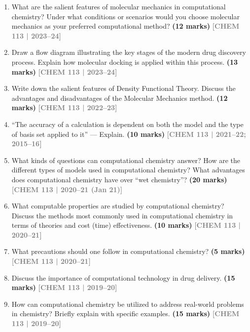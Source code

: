 \documentclass[12pt,a3paper]{article}
\newcommand{\yr}[1]{\hfill\textcolor{gray}{\small\textbf{[#1]}}}
\newcommand{\mk}[1]{\textcolor{orange!70!black}{\small\textbf{(#1 marks)}}}
\begin{document}
\begin{enumerate}
\item What are the salient features of molecular mechanics in computational chemistry? Under what conditions or scenarios would you choose molecular mechanics as your preferred computational method? \mk{12}
\yr{CHEM 113 | 2023--24}



\item Draw a flow diagram illustrating the key stages of the modern drug discovery process. Explain how molecular docking is applied within this process. \mk{13}
\yr{CHEM 113 | 2023--24}




\item Write down the salient features of Density Functional Theory. Discuss the advantages and disadvantages of the Molecular Mechanics method. \mk{12}
\yr{CHEM 113 | 2022--23}



\item ``The accuracy of a calculation is dependent on both the model and the type of basis set applied to it'' --- Explain. \mk{10}
\yr{CHEM 113 | 2021--22; 2015--16}



\item What kinds of questions can computational chemistry answer? How are the different types of models used in computational chemistry? What advantages does computational chemistry have over ``wet chemistry''? \mk{20}
\yr{CHEM 113 | 2020--21 (Jan 21)}



\item What computable properties are studied by computational chemistry? Discuss the methods most commonly used in computational chemistry in terms of theories and cost (time) effectiveness. \mk{10}
\yr{CHEM 113 | 2020--21}



\item What precautions should one follow in computational chemistry? \mk{5}
\yr{CHEM 113 | 2020--21}



\item Discuss the importance of computational technology in drug delivery. \mk{15}
\yr{CHEM 113 | 2019--20}



\item How can computational chemistry be utilized to address real-world problems in chemistry? Briefly explain with specific examples. \mk{15}
\yr{CHEM 113 | 2019--20}




\end{enumerate}
\end{document}
